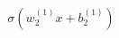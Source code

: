 \documentclass[preview]{standalone}
\begin{document}
\begin{align*}
\sigma(w_2^{(1)} x + b_2^{(1)})
\end{align*}
\end{document}
